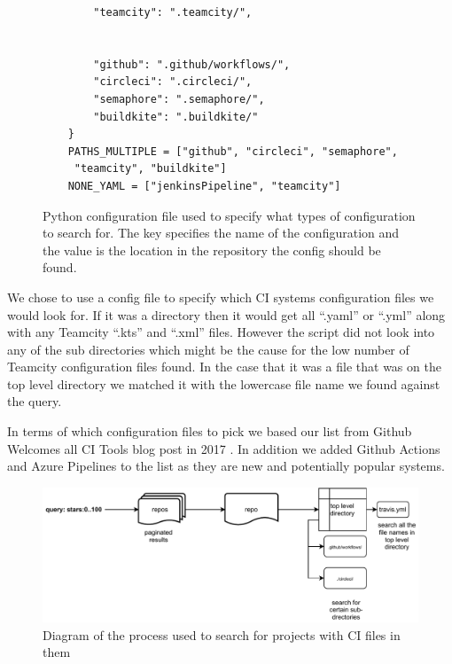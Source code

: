 \documentclass[10pt,conference]{IEEEtran}
\begin{document}
\begin{figure}[!htbp]
\begin{minipage}{.48\textwidth}
\begin{verbatim}
        "teamcity": ".teamcity/",
    
    
        "github": ".github/workflows/",
        "circleci": ".circleci/",
        "semaphore": ".semaphore/",
        "buildkite": ".buildkite/"
    }
    PATHS_MULTIPLE = ["github", "circleci", "semaphore",
     "teamcity", "buildkite"]
    NONE_YAML = ["jenkinsPipeline", "teamcity"]
    \end{verbatim}
    \caption{Python configuration file used to specify what types of configuration to search for. The key specifies the name of the configuration and the value is the location in the repository the config should be found.}
  \end{minipage}
\end{figure}

We chose to use a config file to specify which CI systems configuration files we would look for. If it was a directory then it would get all \enquote{.yaml} or \enquote{.yml} along with any Teamcity \enquote{.kts} and \enquote{.xml} files. However the script did not look into any of the sub directories which might be the cause for the low number of Teamcity configuration files found. In the case that it was a file that was on the top level directory we matched it with the lowercase file name we found against the query.

In terms of which configuration files to pick we based our list from Github Welcomes all CI Tools blog post in 2017 \cite{Github2017}. In addition we added Github Actions and Azure Pipelines to the list as they are new and potentially popular systems. 

\begin{figure}[h]
  \centering
  \includegraphics[width=\textwidth]{methadology diagram.pdf}
  
  \caption[alt text]{Diagram of the process used to search for projects with CI files in them}
  \label{image_methadolgoy_diagram}
\end{figure}
\end{document}
